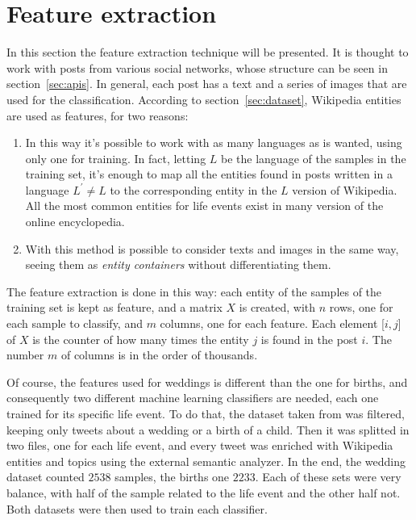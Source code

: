\section{Feature extraction}
\label{sec:featurextraction}
In this section the feature extraction technique will be presented. It is thought to work with posts from various social networks, whose structure can be seen in section~\ref{sec:apis}. In general, each post has a text and a series of images that are used for the classification. According to section~\ref{sec:dataset}, Wikipedia entities are used as features, for two reasons:
\begin{enumerate}
\item In this way it's possible to work with as many languages as is wanted, using only one for training. In fact, letting $ L $ be the language of the samples in the training set, it's enough to map all the entities found in posts written in a language $ L^{'} \ne L $ to the corresponding entity in the $ L $ version of Wikipedia. All the most common entities for life events exist in many version of the online encyclopedia.
\item With this method is possible to consider texts and images in the same way, seeing them as \emph{entity containers} without differentiating them.
\end{enumerate}

The feature extraction is done in this way: each entity of the samples of the training set is kept as feature, and a matrix $X$ is created, with $n$ rows, one for each sample to classify, and $m$ columns, one for each feature. Each element [$i,j$] of $X$ is the counter of how many times the entity $j$ is found in the post $i$. The number $m$ of columns is in the order of thousands.

Of course, the features used for weddings is different than the one for births, and consequently two different machine learning classifiers are needed, each one trained for its specific life event. To do that, the dataset taken from \cite{dickinson2015identifying} was filtered, keeping only tweets about a wedding or a birth of a child. Then it was splitted in two files, one for each life event, and every tweet was enriched with Wikipedia entities and topics using the external semantic analyzer. In the end, the wedding dataset counted $2538$ samples, the births one $2233$. Each of these sets were very balance, with half of the sample related to the life event and the other half not. Both datasets were then used to train each classifier.

